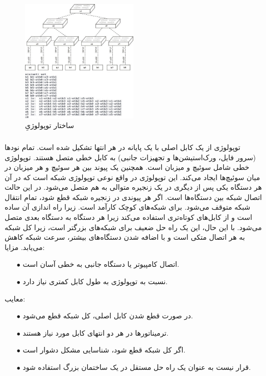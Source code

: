 \documentclass{article}
\begin{document}
\begin{figure}[H]
    \centering
    \includegraphics[width=0.5\textwidth]{figures/3a.jpg}
    \caption
	{
ساختار توپولوژیِ  
	}
    \label{fig:fig1}
\end{figure}
\subsubsection{}
توپولوژی  از یک کابل اصلی با یک پایانه در هر انتها تشکیل شده است. تمام نودها (سرور فایل، ورک‌استیشن‌ها و تجهیزات جانبی) به کابل خطی متصل هستند. توپولوژی خطی شامل  سوئیچ و  میزبان است. همچنین یک پیوند بین هر سوئیچ و هر میزبان در میان سوئیچ‌ها ایجاد می‌کند. این توپولوژی در واقع نوعی توپولوژی شبکه است که در آن هر دستگاه یکی پس از دیگری در یک زنجیره متوالی به هم متصل می‌شود. در این حالت  اتصال شبکه بین دستگاه‌ها است. اگر هر پیوندی در زنجیره شبکه قطع شود، تمام انتقال شبکه متوقف می‌شود. برای شبکه‌های کوچک کارآمد است. زیرا راه اندازی آن ساده است و از کابل‌های کوتاه‌تری استفاده می‌کند زیرا هر دستگاه به دستگاه بعدی متصل می‌شود. با این حال، این یک راه حل ضعیف برای شبکه‌های بزرگتر است، زیرا کل شبکه به هر اتصال متکی است و با اضافه شدن دستگاه‌های بیشتر، سرعت شبکه کاهش می‌یابد.
\newline
\newline
مزایا:

\begin{itemize}
\item [$\bullet$] اتصال کامپیوتر یا دستگاه جانبی به  خطی آسان است.
\item [$\bullet$] نسبت به توپولوژی  به طول کابل کمتری نیاز دارد.
\end{itemize}
معایب:
\begin{itemize}
\item [$\bullet$] در صورت قطع شدن کابل اصلی، کل شبکه قطع می‌شود.
\item [$\bullet$] ترمیناتورها در هر دو انتهای کابل  مورد نیاز هستند.
\item [$\bullet$] اگر کل شبکه قطع شود، شناسایی مشکل دشوار است.
\item [$\bullet$] قرار نیست به عنوان یک راه حل مستقل در یک ساختمان بزرگ استفاده شود.

\end{itemize}
\end{document}
